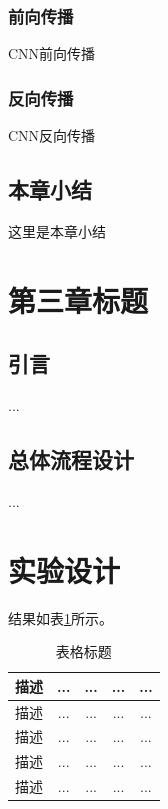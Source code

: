 \documentclass[UTF8, twoside]{ctexart}
\begin{document}
\subsubsection{前向传播}
CNN前向传播

\subsubsection{反向传播}
CNN反向传播

\subsection{本章小结}
这里是本章小结



\vspace*{3pt}
\cleardoublepage
\section{第三章标题}
\subsection{引言}
...

\subsection{总体流程设计}
...




\vspace*{3pt}
\cleardoublepage
\section{实验设计}
结果如表\ref{tab:FLOP}所示。
\begin{table}[tbhp]
    \centering
    \caption{表格标题}
    \label{tab:FLOP}
    \begin{tabular}{ccccc}
        \hline
        描述 & ... & ... & ... & ... \\
        \hline
        描述 & ... & ... & ... & ... \\
        描述 & ... & ... & ... & ... \\
        描述 & ... & ... & ... & ... \\
        描述 & ... & ... & ... & ... \\
        \hline
    \end{tabular}
\end{table}
\end{document}
